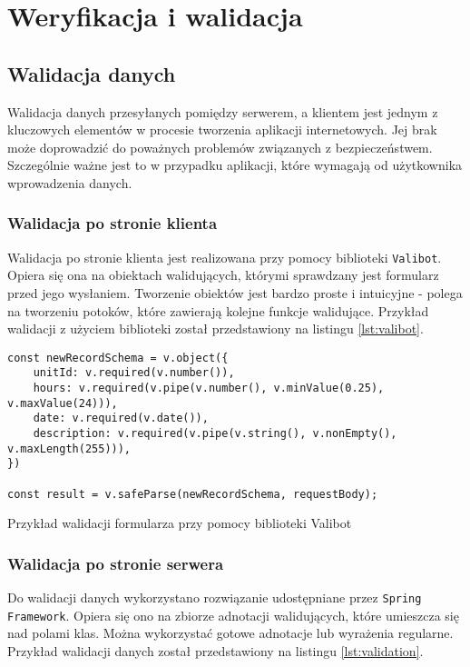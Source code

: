 \chapter{Weryfikacja i walidacja}
\label{ch:06}

\section{Walidacja danych}

Walidacja danych przesyłanych pomiędzy serwerem, a klientem jest jednym z kluczowych elementów w procesie tworzenia aplikacji internetowych. Jej brak może doprowadzić do poważnych problemów związanych z bezpieczeństwem. Szczególnie ważne jest to w przypadku aplikacji, które wymagają od użytkownika wprowadzenia danych.

\subsection{Walidacja po stronie klienta}

Walidacja po stronie klienta jest realizowana przy pomocy biblioteki \texttt{Valibot}. Opiera się ona na obiektach walidujących, którymi sprawdzany jest formularz przed jego wysłaniem. Tworzenie obiektów jest bardzo proste i intuicyjne - polega na tworzeniu potoków, które zawierają kolejne funkcje walidujące. Przykład walidacji z użyciem biblioteki został przedstawiony na listingu \ref{lst:valibot}.

\begin{listing}[H]
    \begin{verbatim}
const newRecordSchema = v.object({
    unitId: v.required(v.number()),
    hours: v.required(v.pipe(v.number(), v.minValue(0.25), v.maxValue(24))),
    date: v.required(v.date()),
    description: v.required(v.pipe(v.string(), v.nonEmpty(), v.maxLength(255))),
})

const result = v.safeParse(newRecordSchema, requestBody);
    \end{verbatim}
    \caption{Przykład walidacji formularza przy pomocy biblioteki Valibot}
    \label{lst:valibot}
\end{listing}

\subsection{Walidacja po stronie serwera}

Do walidacji danych wykorzystano rozwiązanie udostępniane przez \texttt{Spring Framework}. Opiera się ono na zbiorze adnotacji walidujących, które umieszcza się nad polami klas. Można wykorzystać gotowe adnotacje lub wyrażenia regularne. Przykład walidacji danych został przedstawiony na listingu \ref{lst:validation}.

